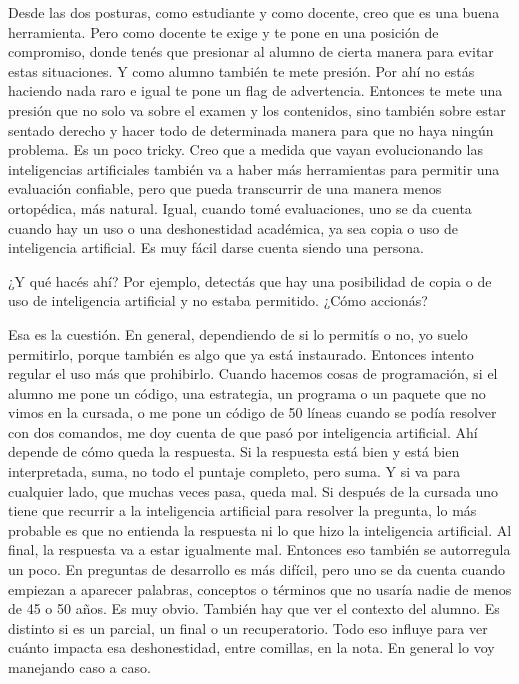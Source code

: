\begin{description}[leftmargin=0cm, labelsep=0.5cm, style=nextline]
\item[\textbf{Entrevistado:}] Desde las dos posturas, como estudiante y como docente, creo que es una buena herramienta. Pero como docente te exige y te pone en una posición de compromiso, donde tenés que presionar al alumno de cierta manera para evitar estas situaciones. Y como alumno también te mete presión. Por ahí no estás haciendo nada raro e igual te pone un flag de advertencia. Entonces te mete una presión que no solo va sobre el examen y los contenidos, sino también sobre estar sentado derecho y hacer todo de determinada manera para que no haya ningún problema. Es un poco tricky. Creo que a medida que vayan evolucionando las inteligencias artificiales también va a haber más herramientas para permitir una evaluación confiable, pero que pueda transcurrir de una manera menos ortopédica, más natural. Igual, cuando tomé evaluaciones, uno se da cuenta cuando hay un uso o una deshonestidad académica, ya sea copia o uso de inteligencia artificial. Es muy fácil darse cuenta siendo una persona.
\item[\textbf{Entrevistadores:}] ¿Y qué hacés ahí? Por ejemplo, detectás que hay una posibilidad de copia o de uso de inteligencia artificial y no estaba permitido. ¿Cómo accionás?
\item[\textbf{Entrevistado:}] Esa es la cuestión. En general, dependiendo de si lo permitís o no, yo suelo permitirlo, porque también es algo que ya está instaurado. Entonces intento regular el uso más que prohibirlo. Cuando hacemos cosas de programación, si el alumno me pone un código, una estrategia, un programa o un paquete que no vimos en la cursada, o me pone un código de 50 líneas cuando se podía resolver con dos comandos, me doy cuenta de que pasó por inteligencia artificial. Ahí depende de cómo queda la respuesta. Si la respuesta está bien y está bien interpretada, suma, no todo el puntaje completo, pero suma. Y si va para cualquier lado, que muchas veces pasa, queda mal. Si después de la cursada uno tiene que recurrir a la inteligencia artificial para resolver la pregunta, lo más probable es que no entienda la respuesta ni lo que hizo la inteligencia artificial. Al final, la respuesta va a estar igualmente mal. Entonces eso también se autorregula un poco. En preguntas de desarrollo es más difícil, pero uno se da cuenta cuando empiezan a aparecer palabras, conceptos o términos que no usaría nadie de menos de 45 o 50 años. Es muy obvio. También hay que ver el contexto del alumno. Es distinto si es un parcial, un final o un recuperatorio. Todo eso influye para ver cuánto impacta esa deshonestidad, entre comillas, en la nota. En general lo voy manejando caso a caso.

\end{description}
